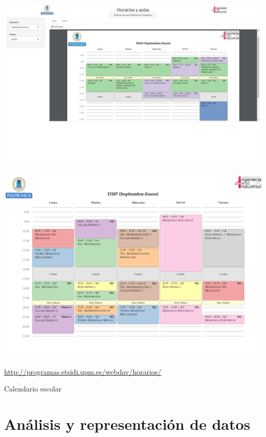 \documentclass[spanish, xcolor={usenames,svgnames,dvipsnames}]{beamer}
\begin{document}
\begin{frame}[label={sec:org65f1b3a}]{}
\begin{center}
\includegraphics[width=.9\linewidth]{images/horarios_tt.png}
\end{center}
\end{frame}

\begin{frame}[label={sec:org7a07d98}]{}
\begin{center}
\includegraphics[width=.9\linewidth]{images/D307_1.pdf}
\end{center}

\url{http://programas.etsidi.upm.es/webdav/horarios/}
\end{frame}


\begin{frame}[label={sec:org4f4b462}]{Calendario escolar}
\end{frame}

\section{Análisis y representación de datos}
\label{sec:org01ffcde}
\end{document}
